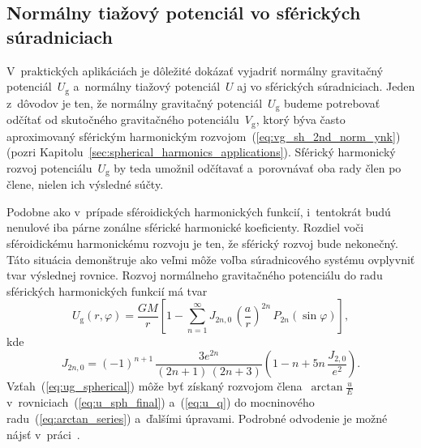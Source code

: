 \documentclass[a4paper, 12pt]{book}
\newcommand{\gidx}{\mathrm g}
\begin{document}
\subsection{Normálny tiažový potenciál vo sférických súradniciach}
\label{sec:normal_gravity_potential_in_spherical_coords}

V~praktických aplikáciách je dôležité dokázať vyjadriť normálny gravitačný 
potenciál~$U_\gidx$ a~normálny tiažový potenciál~$U$ aj vo sférických 
súradniciach.  Jeden z~dôvodov je ten, že normálny gravitačný 
potenciál~$U_\gidx$ budeme potrebovať odčítať od skutočného gravitačného 
potenciálu~$V_\gidx$, ktorý býva často aproximovaný sférickým harmonickým 
rozvojom~(\ref{eq:vg_sh_2nd_norm_ynk}) (pozri 
Kapitolu~\ref{sec:spherical_harmonics_applications}).  Sférický harmonický 
rozvoj potenciálu~$U_\gidx$ by teda umožnil odčítavať a~porovnávať oba rady 
člen po člene, nielen ich výsledné súčty.

Podobne ako v~prípade sféroidických harmonických funkcií, i~tentokrát budú 
nenulové iba párne zonálne sférické harmonické koeficienty.  Rozdiel voči 
sféroidickému harmonickému rozvoju je ten, že sférický rozvoj bude nekonečný.  
Táto situácia demonštruje ako veľmi môže voľba súradnicového systému ovplyvniť 
tvar výslednej rovnice.  Rozvoj normálneho gravitačného potenciálu do radu 
sférických harmonických funkcií má tvar \parencite{Moritz1967}
%
\begin{equation}
\label{eq:ug_spherical}
U_\gidx(r, \varphi) = \frac{GM}{r} \left[ 1 - \sum_{n = 1}^{\infty} J_{2n,0} \, 
\left( \frac{a}{r} \right)^{2n} \, P_{2n}(\sin\varphi) \right]{,}
\end{equation}
%
kde
%
\begin{equation}
\label{eq:j2n0}
J_{2n,0} = (-1)^{n + 1} \, \frac{3e^{2n}}{(2n + 1) \, (2n + 3)} \left( 
1 - n + 5n \, \frac{J_{2,0}}{e^2} \right){.}
\end{equation}
%
Vzťah~(\ref{eq:ug_spherical}) môže byť získaný rozvojom 
člena~$\arctan\frac{u}{E}$ v~rovniciach~(\ref{eq:u_sph_final}) a~(\ref{eq:u_q}) 
do mocninového radu~(\ref{eq:arctan_series}) a~ďalšími úpravami.  Podrobné 
odvodenie je možné nájsť v~práci~\textcite{Moritz1967}.
\end{document}
